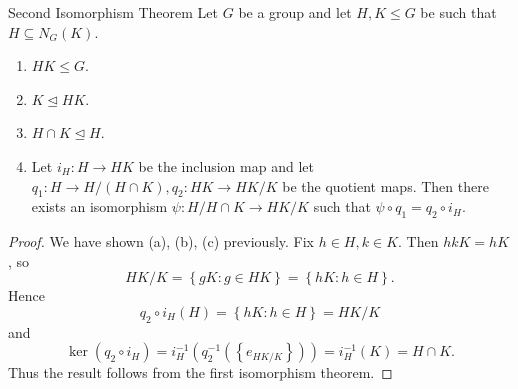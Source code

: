\documentclass[pmath347]{subfiles}
\begin{document}
    \clearpage
    \begin{theorem}{Second Isomorphism Theorem}
        Let $G$ be a group and let $H,K\leq G$ be such that $H\subseteq N_G\left( K \right)$.
        \begin{enumerate}
            \item $HK\leq G$.
            \item $K\trianglelefteq HK$.
            \item $H\cap K\trianglelefteq H$.
            \item Let $i_H:H\to HK$ be the inclusion map and let $q_1:H\to H /\left( H\cap K \right) , q_2: HK\to HK /K$ be the quotient maps. Then there exists an isomorphism $\psi:H /H\cap K\to HK /K$ such that $\psi\circ q_1 = q_2\circ i_H$.
        \end{enumerate}
    \end{theorem}

    \begin{proof}
        We have shown (a), (b), (c) previously. Fix $h\in H, k\in K$. Then $hkK = hK$, so
        \begin{equation*}
            HK /K = \left\lbrace gK:g\in HK \right\rbrace = \left\lbrace hK:h\in H \right\rbrace .
        \end{equation*}
        Hence
        \begin{equation*}
            q_2\circ i_H\left( H \right) = \left\lbrace hK:h\in H \right\rbrace = HK /K
        \end{equation*}
        and
        \begin{equation*}
            \ker\left( q_2\circ i_H \right) = i_H^{-1} \left( q_2^{-1} \left( \left\lbrace e_{HK /K} \right\rbrace  \right)  \right) = i_H^{-1} \left( K \right) = H\cap K.
        \end{equation*}
        Thus the result follows from the first isomorphism theorem.
    \end{proof}






























    
    
    
    
    
    
    
\end{document}
